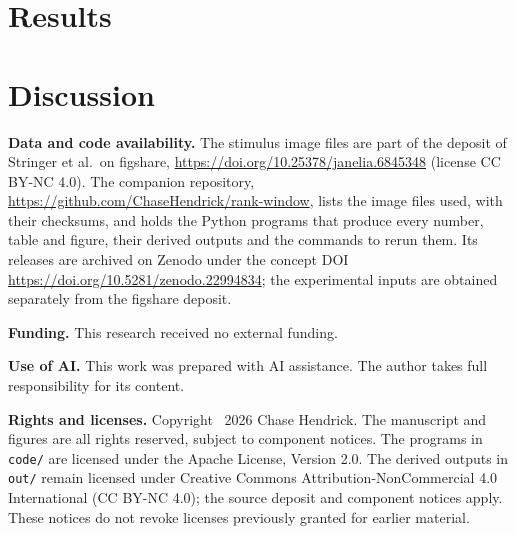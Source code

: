 \documentclass[11pt]{article}
\theoremstyle{definition}
\begin{document}
\section{Results}\label{sec:results}



\section{Discussion}\label{sec:discussion}



\medskip
{\raggedright\noindent\textbf{Data and code availability.} The stimulus image files are part of the deposit of Stringer et al.\ on figshare, \url{https://doi.org/10.25378/janelia.6845348} (license CC BY-NC 4.0). The companion repository, \url{https://github.com/ChaseHendrick/rank-window}, lists the image files used, with their checksums, and holds the Python programs that produce every number, table and figure, their derived outputs and the commands to rerun them. Its releases are archived on Zenodo under the concept DOI \url{https://doi.org/10.5281/zenodo.22994834}; the experimental inputs are obtained separately from the figshare deposit.\par}

\noindent\textbf{Funding.} This research received no external funding.

\noindent\textbf{Use of AI.} This work was prepared with AI assistance. The author takes full responsibility for its content.

\medskip
\noindent\textbf{Rights and licenses.} Copyright \textcopyright\ 2026 Chase Hendrick. The manuscript and figures are all rights reserved, subject to component notices. The programs in \texttt{code/} are licensed under the Apache License, Version 2.0. The derived outputs in \texttt{out/} remain licensed under Creative Commons Attribution-NonCommercial 4.0 International (CC BY-NC 4.0); the source deposit and component notices apply. These notices do not revoke licenses previously granted for earlier material.
\end{document}
